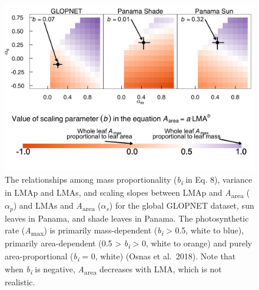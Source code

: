 \documentclass[
  12pt,
]{article}
\begin{document}
\begin{figure}
\hypertarget{fig:massplt}{%
\centering
\includegraphics{../figs/mass_prop4.png}
\caption{The relationships among mass proportionality (\emph{b\textsubscript{i}} in Eq. 8), variance in LMAp and LMAs, and scaling slopes between LMAp and \emph{A}\textsubscript{area} (\(\alpha_p\)) and LMAs and \emph{A}\textsubscript{area} (\(\alpha_s\)) for the global GLOPNET dataset, sun leaves in Panama, and shade leaves in Panama.
The photosynthetic rate (\emph{A}\textsubscript{max}) is primarily mass-dependent (\emph{b\textsubscript{i}} \textgreater{} 0.5, white to blue), primarily area-dependent (0.5 \textgreater{} \emph{b\textsubscript{i}} \textgreater{} 0, white to orange) and purely area-proportional (\emph{b\textsubscript{i}} = 0, white) (Osnas et al.~2018).
Note that when \emph{b\textsubscript{i}} is negative, \emph{A}\textsubscript{area} decreases with LMA, which is not realistic.}\label{fig:massplt}
}
\end{figure}

\newpage
\end{document}

